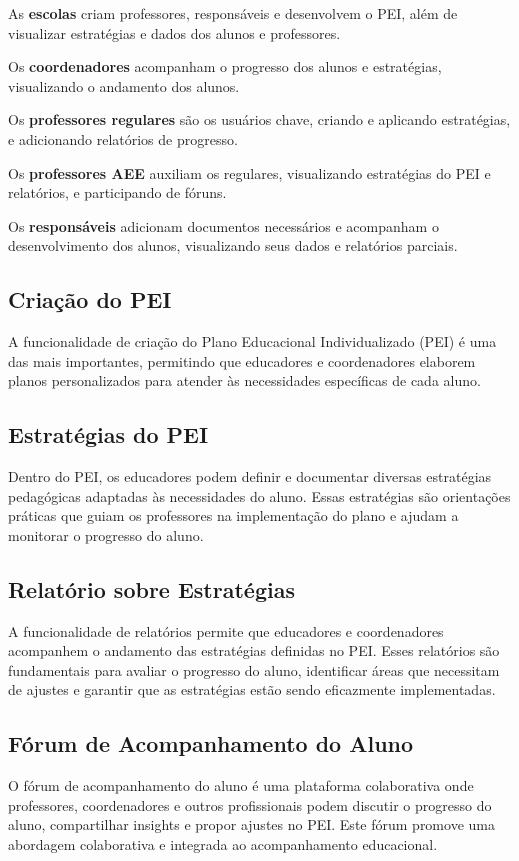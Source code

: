 \documentclass[sigconf]{webmedia}
\begin{document}
As {\bfseries escolas}  criam professores, responsáveis e
desenvolvem o PEI, além de visualizar estratégias e dados dos alunos
e professores.

Os {\bfseries coordenadores}  acompanham o progresso dos alunos
e estratégias, visualizando o andamento dos alunos.

Os {\bfseries professores
regulares}  são os usuários chave, criando e aplicando estratégias, e
adicionando relatórios de progresso.

Os {\bfseries professores AEE}  auxiliam
os regulares, visualizando estratégias do PEI e relatórios, e
participando de fóruns.

Os {\bfseries responsáveis}  adicionam documentos
necessários e acompanham o desenvolvimento dos alunos, visualizando
seus dados e relatórios parciais.


\subsection{Criação do PEI}
A funcionalidade de criação do Plano Educacional Individualizado
(PEI) é uma das mais importantes, permitindo que educadores e 
coordenadores elaborem planos personalizados para atender às 
necessidades específicas de cada aluno.


\subsection{Estratégias do PEI}
Dentro do PEI, os educadores podem definir e documentar diversas 
estratégias pedagógicas adaptadas às necessidades do aluno. Essas 
estratégias são orientações práticas que guiam os professores na 
implementação do plano e ajudam a monitorar o progresso do aluno.

\subsection{Relatório sobre Estratégias}
A funcionalidade de relatórios permite que educadores e coordenadores 
acompanhem o andamento das estratégias definidas no PEI. 
Esses relatórios são fundamentais para avaliar o progresso do aluno, 
identificar áreas que necessitam de ajustes e garantir que as 
estratégias estão sendo eficazmente implementadas.

\subsection{Fórum de Acompanhamento do Aluno}
O fórum de acompanhamento do aluno é uma plataforma colaborativa onde 
professores, coordenadores e outros profissionais podem discutir o 
progresso do aluno, compartilhar insights e propor ajustes no PEI. 
Este fórum promove uma abordagem colaborativa e integrada ao 
acompanhamento educacional.
\end{document}
